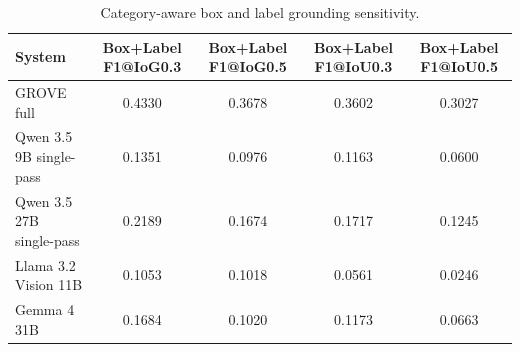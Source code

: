 \begin{table}[t]
\centering
\small
\caption{Category-aware box and label grounding sensitivity.}
\label{tab:box\_label\_sensitivity}
\begin{tabular}{lcccc}
\toprule
System & Box+Label F1@IoG0.3 & Box+Label F1@IoG0.5 & Box+Label F1@IoU0.3 & Box+Label F1@IoU0.5 \\
\midrule
GROVE full & 0.4330 & 0.3678 & 0.3602 & 0.3027 \\
Qwen 3.5 9B single-pass & 0.1351 & 0.0976 & 0.1163 & 0.0600 \\
Qwen 3.5 27B single-pass & 0.2189 & 0.1674 & 0.1717 & 0.1245 \\
Llama 3.2 Vision 11B & 0.1053 & 0.1018 & 0.0561 & 0.0246 \\
Gemma 4 31B & 0.1684 & 0.1020 & 0.1173 & 0.0663 \\
\bottomrule
\end{tabular}
\end{table}
